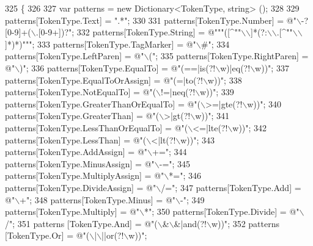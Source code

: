 \begin{DoxyCode}
325         \{
326 
327             var patterns = \textcolor{keyword}{new} Dictionary<TokenType, string> ();
328 
329             patterns[TokenType.Text] = \textcolor{stringliteral}{".*"};
330 
331             patterns[TokenType.Number] = \textcolor{stringliteral}{@"\(\backslash\)-?[0-9]+(\(\backslash\).[0-9+])?"};
332             patterns[TokenType.String] = \textcolor{stringliteral}{@"""([^""\(\backslash\)\(\backslash\)]*(?:\(\backslash\)\(\backslash\).[^""\(\backslash\)\(\backslash\)]*)*)"""};
333             patterns[TokenType.TagMarker] = \textcolor{stringliteral}{@"\(\backslash\)#"};
334             patterns[TokenType.LeftParen] = \textcolor{stringliteral}{@"\(\backslash\)("};
335             patterns[TokenType.RightParen] = \textcolor{stringliteral}{@"\(\backslash\))"};
336             patterns[TokenType.EqualTo] = \textcolor{stringliteral}{@"(==|is(?!\(\backslash\)w)|eq(?!\(\backslash\)w))"};
337             patterns[TokenType.EqualToOrAssign] = \textcolor{stringliteral}{@"(=|to(?!\(\backslash\)w))"};
338             patterns[TokenType.NotEqualTo] = \textcolor{stringliteral}{@"(\(\backslash\)!=|neq(?!\(\backslash\)w))"};
339             patterns[TokenType.GreaterThanOrEqualTo] = \textcolor{stringliteral}{@"(\(\backslash\)>=|gte(?!\(\backslash\)w))"};
340             patterns[TokenType.GreaterThan] = \textcolor{stringliteral}{@"(\(\backslash\)>|gt(?!\(\backslash\)w))"};
341             patterns[TokenType.LessThanOrEqualTo] = \textcolor{stringliteral}{@"(\(\backslash\)<=|lte(?!\(\backslash\)w))"};
342             patterns[TokenType.LessThan] = \textcolor{stringliteral}{@"(\(\backslash\)<|lt(?!\(\backslash\)w))"};
343             patterns[TokenType.AddAssign] = \textcolor{stringliteral}{@"\(\backslash\)+="};
344             patterns[TokenType.MinusAssign] = \textcolor{stringliteral}{@"\(\backslash\)-="};
345             patterns[TokenType.MultiplyAssign] = \textcolor{stringliteral}{@"\(\backslash\)*="};
346             patterns[TokenType.DivideAssign] = \textcolor{stringliteral}{@"\(\backslash\)/="};
347             patterns[TokenType.Add] = \textcolor{stringliteral}{@"\(\backslash\)+"};
348             patterns[TokenType.Minus] = \textcolor{stringliteral}{@"\(\backslash\)-"};
349             patterns[TokenType.Multiply] = \textcolor{stringliteral}{@"\(\backslash\)*"};
350             patterns[TokenType.Divide] = \textcolor{stringliteral}{@"\(\backslash\)/"};
351             patterns [TokenType.And] = \textcolor{stringliteral}{@"(\(\backslash\)&\(\backslash\)&|and(?!\(\backslash\)w))"};
352             patterns [TokenType.Or] = \textcolor{stringliteral}{@"(\(\backslash\)|\(\backslash\)||or(?!\(\backslash\)w))"};

\end{DoxyCode}
